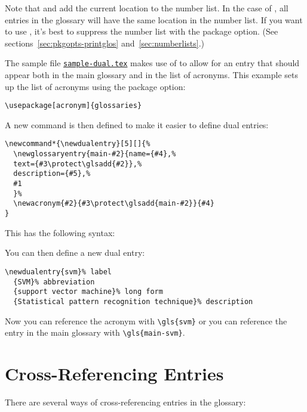 \documentclass{nlctdoc}
\newcommand*{\samplefile}[1]{\hyperref[ex:sample#1]{\texttt{sample#1.tex}}}
\begin{document}
\begin{important}
Note that  and  add the current location to
the number list. In the case of , all entries in the
glossary will have the same location in the number list. If you want
to use , it's best to suppress the number list with
the  package option. (See
sections~\ref{sec:pkgopts-printglos} and~\ref{sec:numberlists}.)
\end{important}

The sample file \samplefile{-dual} makes use of  to
allow for an entry that should appear both in the main glossary and
in the list of acronyms. This example sets up the list of acronyms
using the  package option:
\begin{verbatim}
\usepackage[acronym]{glossaries}
\end{verbatim}
A new command is then defined to make it easier to define dual
entries:
\begin{verbatim}
\newcommand*{\newdualentry}[5][]{%
  \newglossaryentry{main-#2}{name={#4},%
  text={#3\protect\glsadd{#2}},%
  description={#5},%
  #1
  }%
  \newacronym{#2}{#3\protect\glsadd{main-#2}}{#4}
}
\end{verbatim}
This has the following syntax:
\begin{definition}
\end{definition}
You can then define a new dual entry:
\begin{verbatim}
\newdualentry{svm}% label
  {SVM}% abbreviation
  {support vector machine}% long form
  {Statistical pattern recognition technique}% description
\end{verbatim}
Now you can reference the acronym with \verb|\gls{svm}| or you can
reference the entry in the main glossary with \verb|\gls{main-svm}|.

\section{Cross-Referencing Entries}
\label{sec:crossref}

There are several ways of cross-referencing entries in the 
glossary: 
\end{document}
